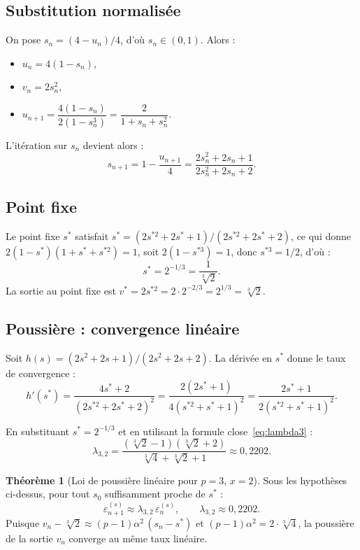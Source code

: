 \documentclass[11pt,a4paper]{article}
\theoremstyle{definition}
\newtheorem{theorem}{Théorème}[section]
\newcommand{\cbrt}[1]{\sqrt[3]{#1}}
\newcommand{\eps}{\varepsilon}
\begin{document}
\subsection{Substitution normalisée}

On pose $s_n = (4 - u_n)/4$, d'où $s_n \in (0,1)$. Alors :
\begin{itemize}
  \item $u_n = 4(1 - s_n)$,
  \item $v_n = 2s_n^2$,
  \item $u_{n+1} = \dfrac{4(1-s_n)}{2(1-s_n^3)} = \dfrac{2}{1 + s_n + s_n^2}$.
\end{itemize}

L'itération sur $s_n$ devient alors :
\begin{equation}
  \label{eq:iter_s3}
  s_{n+1} = 1 - \frac{u_{n+1}}{4} = \frac{2s_n^2 + 2s_n + 1}{2s_n^2 + 2s_n + 2}.
\end{equation}

\subsection{Point fixe}

Le point fixe $s^*$ satisfait $s^* = (2s^{*2} + 2s^* + 1)/(2s^{*2} + 2s^* + 2)$, ce qui donne $2(1-s^*)(1+s^*+s^{*2}) = 1$, soit $2(1-s^{*3}) = 1$, donc $s^{*3} = 1/2$, d'où :
\[
  s^* = 2^{-1/3} = \frac{1}{\cbrt{2}}.
\]
La sortie au point fixe est $v^* = 2s^{*2} = 2 \cdot 2^{-2/3} = 2^{1/3} = \cbrt{2}$. \checkmark

\subsection{Poussière : convergence linéaire}

Soit $h(s) = (2s^2 + 2s + 1)/(2s^2 + 2s + 2)$. La dérivée en $s^*$ donne le taux de convergence :
\[
  h'(s^*) = \frac{4s^* + 2}{(2s^{*2} + 2s^* + 2)^2} = \frac{2(2s^*+1)}{4(s^{*2}+s^*+1)^2} = \frac{2s^*+1}{2(s^{*2}+s^*+1)^2}.
\]

En substituant $s^* = 2^{-1/3}$ et en utilisant la formule close~\eqref{eq:lambda3} :
\[
  \lambda_{3,2} = \frac{(\cbrt{2}-1)(\cbrt{2}+2)}{\cbrt{4}+\cbrt{2}+1} \approx 0{,}2202.
\]

\begin{theorem}[Loi de poussière linéaire pour $p=3$, $x=2$]
Sous les hypothèses ci-dessus, pour tout $s_0$ suffisamment proche de $s^*$ :
\[
  \eps_{n+1}^{(s)} \approx \lambda_{3,2}\,\eps_n^{(s)}, \qquad \lambda_{3,2} \approx 0{,}2202.
\]
Puisque $v_n - \cbrt{2} \approx (p-1)\alpha^2\,(s_n - s^*)$ et $(p-1)\alpha^2 = 2 \cdot \cbrt{4}$, la poussière de la sortie $v_n$ converge au même taux linéaire.
\end{theorem}
\end{document}
